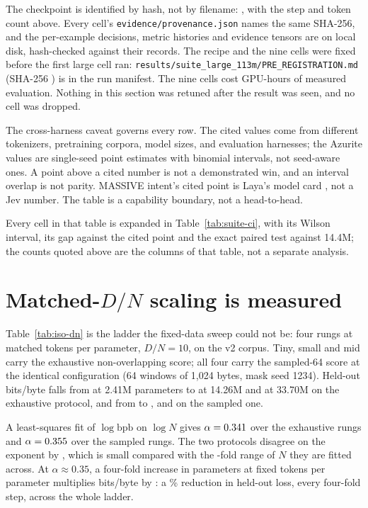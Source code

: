 The checkpoint is identified by hash, not by filename: \SuiteCkptLarge, with the
step and token count above. Every cell's \texttt{evidence/provenance.json} names
the same SHA-256, and the per-example decisions, metric histories and evidence
tensors are on local disk, hash-checked against their records. The recipe and the
nine cells were fixed before the first large cell ran:
\texttt{results/suite\_large\_113m/PRE\_REGISTRATION.md} (SHA-256
\SuitePreRegSha) is in the run manifest. The nine cells cost
\SuiteLargeGpuHours{} GPU-hours of measured evaluation. Nothing in this section
was retuned after the result was seen, and no cell was dropped.


The cross-harness caveat governs every row. The cited values come from different
tokenizers, pretraining corpora, model sizes, and evaluation harnesses; the
Azurite values are single-seed point estimates with binomial intervals, not
seed-aware ones. A point above a cited number is not a demonstrated win, and an
interval overlap is not parity. MASSIVE intent's cited point is Laya's model card
\citep{laya2026card}, not a Jev number. The table is a capability boundary, not a head-to-head.



Every cell in that table is expanded in Table~\ref{tab:suite-ci}, with its Wilson
interval, its gap against the cited point and the exact paired test against
14.4M; the counts quoted above are the columns of that table, not a separate
analysis.



\section{Matched-\texorpdfstring{$D/N$}{D/N} scaling is measured}
\label{sec:iso}

Table~\ref{tab:iso-dn} is the ladder the fixed-data sweep could not be: four
rungs at matched tokens per parameter, $D/N = 10$, on the v2 corpus. Tiny,
small and mid carry the exhaustive non-overlapping score; all four carry the
sampled-64 score at the identical configuration (64 windows of 1{,}024 bytes,
mask seed 1234). Held-out bits/byte falls from \IsoTinyExh{} at 2.41M parameters to
\IsoSmallExh{} at 14.26M and \IsoMidExh{} at 33.70M on the exhaustive protocol,
and from \IsoTinySamp{} to \IsoSmallSamp, \IsoMidSamp{} and \IsoLargeBpb{} on the
sampled one.

A least-squares fit of $\log \mathrm{bpb}$ on $\log N$ gives
$\alpha = 0.341$ over the \AlphaPoints{} exhaustive rungs and
$\alpha = 0.355$ over the \AlphaPointsSampled{} sampled rungs. The
two protocols disagree on the exponent by \AlphaGap, which is small compared
with the \IsoRange-fold range of $N$ they are fitted across. At
$\alpha \approx 0.35$, a four-fold increase in parameters at fixed tokens per
parameter multiplies bits/byte by \IsoStepFactor: a \IsoStepDrop\% reduction in
held-out loss, every four-fold step, across the whole ladder.

